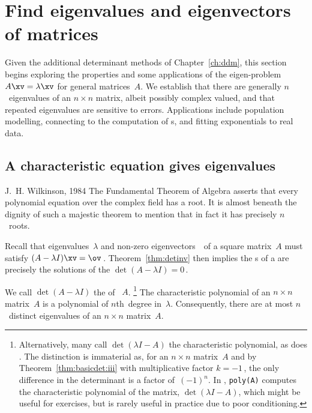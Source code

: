 

\section{Find eigenvalues and eigenvectors of matrices}
\label{sec:eennm}
\secttoc

Given the additional determinant methods of Chapter~\ref{ch:ddm}, this section begins exploring the properties and some applications of the eigen-problem \(A\xv=\lambda\xv\) for general matrices~\(A\).
We establish that there are generally \(n\)~eigenvalues of an \(n\times n\) matrix, albeit possibly complex valued, and that repeated eigenvalues are sensitive to errors.
Applications include population modelling, connecting to the computation of \svd{}s, and fitting exponentials to real data.




\subsection{A characteristic equation gives eigenvalues}
\label{sec:cege}

\begin{quoted}{J.~H. Wilkinson, 1984 \cite[p.103]{Higham1996}}
The Fundamental Theorem of Algebra asserts that every polynomial equation over the complex field has a root.  
It is almost beneath the dignity of such a majestic theorem to mention that in fact it has precisely \(n\)~roots.
\end{quoted}


Recall that eigenvalues~\(\lambda\) and non-zero eigenvectors~\xv\ of a square matrix~\(A\) must satisfy \((A-\lambda I)\xv=\ov\)\,.
Theorem~\ref{thm:detinv} then implies the s of a  are precisely the solutions of the  \(\det(A-\lambda I)=0\)\,.  

\begin{theorem} \label{thm:geecp}
We call \(\det(A-\lambda I)\) the  of ~\(A\). 
\footnote{Alternatively, many call \(\det(\lambda I-A)\) the characteristic polynomial, as does \script.  
The distinction is immaterial as,  for an \(n\times n\) matrix~\(A\) and by Theorem~\ref{thm:basicdet:iii} with multiplicative factor \(k=-1\)\,, the only difference in the determinant is a factor of~\((-1)^n\).
In \script, \texttt{poly(A)} computes the characteristic polynomial of the matrix,  \(\det(\lambda I-A)\), which might be useful for exercises, but is rarely useful in practice due to poor conditioning.} 
The characteristic polynomial of an \(n\times n\) matrix~\(A\) is a polynomial of \(n\)th~degree in~\(\lambda\).
Consequently, there are at most \(n\)~distinct eigenvalues of  an \(n\times n\) matrix~\(A\).
\end{theorem}

